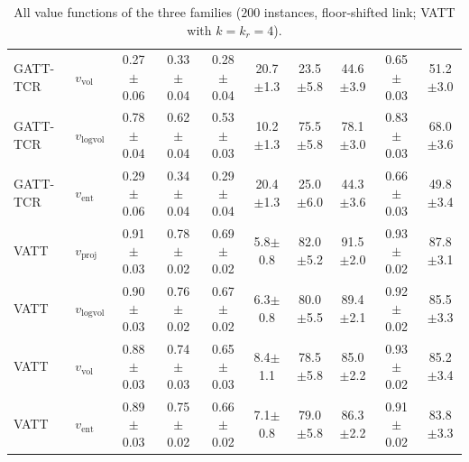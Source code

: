\begin{table}[t]
{\begin{tabular}{llcccccccc}
\addlinespace[2pt]
GATT-TCR & $v_{\mathrm{vol}}$ & 0.27{\scriptsize$\pm$0.06} & 0.33{\scriptsize$\pm$0.04} & 0.28{\scriptsize$\pm$0.04} & 20.7{\scriptsize$\pm$1.3} & 23.5{\scriptsize$\pm$5.8} & 44.6{\scriptsize$\pm$3.9} & 0.65{\scriptsize$\pm$0.03} & 51.2{\scriptsize$\pm$3.0} \\
GATT-TCR & $v_{\mathrm{logvol}}$ & 0.78{\scriptsize$\pm$0.04} & 0.62{\scriptsize$\pm$0.04} & 0.53{\scriptsize$\pm$0.03} & 10.2{\scriptsize$\pm$1.3} & 75.5{\scriptsize$\pm$5.8} & 78.1{\scriptsize$\pm$3.0} & 0.83{\scriptsize$\pm$0.03} & 68.0{\scriptsize$\pm$3.6} \\
GATT-TCR & $v_{\mathrm{ent}}$ & 0.29{\scriptsize$\pm$0.06} & 0.34{\scriptsize$\pm$0.04} & 0.29{\scriptsize$\pm$0.04} & 20.4{\scriptsize$\pm$1.3} & 25.0{\scriptsize$\pm$6.0} & 44.3{\scriptsize$\pm$3.6} & 0.66{\scriptsize$\pm$0.03} & 49.8{\scriptsize$\pm$3.4} \\
\addlinespace[2pt]
VATT & $v_{\mathrm{proj}}$ & 0.91{\scriptsize$\pm$0.03} & 0.78{\scriptsize$\pm$0.02} & 0.69{\scriptsize$\pm$0.02} & 5.8{\scriptsize$\pm$0.8} & 82.0{\scriptsize$\pm$5.2} & 91.5{\scriptsize$\pm$2.0} & 0.93{\scriptsize$\pm$0.02} & 87.8{\scriptsize$\pm$3.1} \\
VATT & $v_{\mathrm{logvol}}$ & 0.90{\scriptsize$\pm$0.03} & 0.76{\scriptsize$\pm$0.02} & 0.67{\scriptsize$\pm$0.02} & 6.3{\scriptsize$\pm$0.8} & 80.0{\scriptsize$\pm$5.5} & 89.4{\scriptsize$\pm$2.1} & 0.92{\scriptsize$\pm$0.02} & 85.5{\scriptsize$\pm$3.3} \\
VATT & $v_{\mathrm{vol}}$ & 0.88{\scriptsize$\pm$0.03} & 0.74{\scriptsize$\pm$0.03} & 0.65{\scriptsize$\pm$0.03} & 8.4{\scriptsize$\pm$1.1} & 78.5{\scriptsize$\pm$5.8} & 85.0{\scriptsize$\pm$2.2} & 0.93{\scriptsize$\pm$0.02} & 85.2{\scriptsize$\pm$3.4} \\
VATT & $v_{\mathrm{ent}}$ & 0.89{\scriptsize$\pm$0.03} & 0.75{\scriptsize$\pm$0.02} & 0.66{\scriptsize$\pm$0.02} & 7.1{\scriptsize$\pm$0.8} & 79.0{\scriptsize$\pm$5.8} & 86.3{\scriptsize$\pm$2.2} & 0.91{\scriptsize$\pm$0.02} & 83.8{\scriptsize$\pm$3.3} \\
\bottomrule
\end{tabular}%
}
\caption{All value functions of the three families ($200$ instances, floor-shifted link; VATT with $k = k_r = 4$).}
\label{tab:exp_values}
\end{table}

